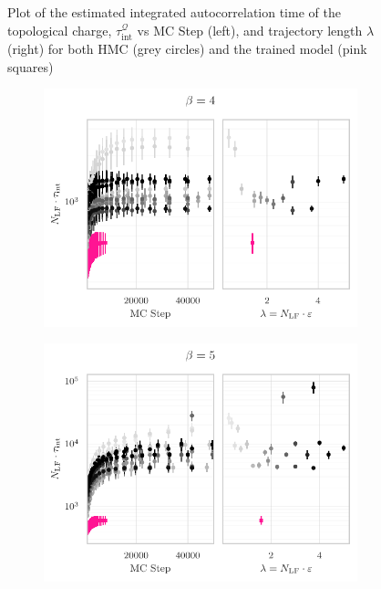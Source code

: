 \documentclass{article} %
\begin{document}
{\begin{figure}[htpb]
\begin{subfigure}{0.4\textwidth}
   \end{subfigure}
   \caption{\label{fig:autocorrbeta23}Plot of the estimated integrated autocorrelation time of the topological charge,
      \(\tau_{\mathrm{int}}^{\mathcal{Q}}\) vs MC Step (left), and trajectory length \(\lambda\) (right) for both HMC
   (grey circles) and the trained model (pink squares)}
\end{figure}
%
\begin{figure}[htpb]
   \centering
   \begin{subfigure}{0.4\textwidth}
      \includegraphics[width=\textwidth]{figures/autocorr_plots_2021_03_09/autocorr_vs_traj_len_2152_b4.pdf}
   \end{subfigure}
   \begin{subfigure}{0.4\textwidth}
      \includegraphics[width=\textwidth]{figures/autocorr_plots_2021_03_09/autocorr_vs_traj_len_2152_b5.pdf}

\end{subfigure}
\end{figure}}
\end{document}
